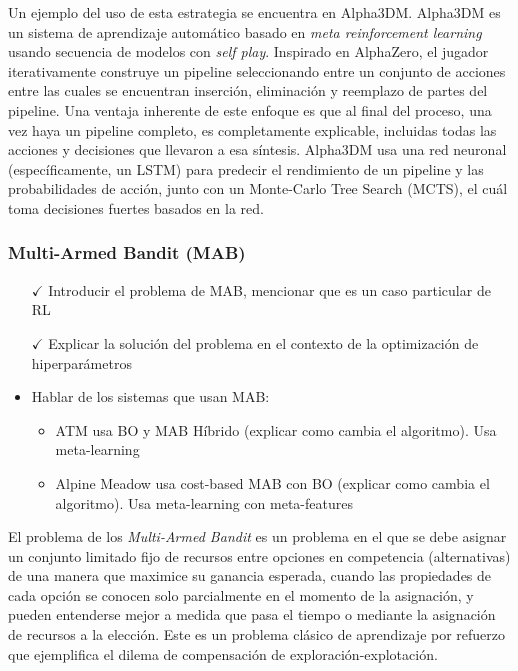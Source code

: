 Un ejemplo del uso de esta estrategia se encuentra en Alpha3DM. Alpha3DM es un sistema de aprendizaje automático basado en \textit{meta reinforcement learning} usando secuencia de modelos con \textit{self play}. Inspirado en AlphaZero, el jugador iterativamente construye un pipeline seleccionando entre un conjunto de acciones entre las cuales se encuentran inserción, eliminación y reemplazo de partes del pipeline. Una ventaja inherente de este enfoque es que al final del proceso, una vez haya un pipeline completo, es completamente explicable, incluidas todas las acciones y decisiones que llevaron a esa síntesis. Alpha3DM usa una red neuronal (específicamente, un LSTM)  para predecir el rendimiento de un pipeline y las probabilidades de acción, junto con un Monte-Carlo Tree Search (MCTS), el cuál toma decisiones fuertes basados en la red.

\subsubsection{Multi-Armed Bandit (MAB)}


\begin{itemize}
	\item[$\checkmark$] Introducir el problema de MAB, mencionar que es un caso particular de RL
	\item[$\checkmark$] Explicar la solución del problema en el contexto de la optimización de hiperparámetros
	\item Hablar de los sistemas que usan MAB:
	\begin{itemize}
		\item ATM usa BO y MAB Híbrido (explicar como cambia el algoritmo). Usa meta-learning
		\item Alpine Meadow usa cost-based MAB con BO (explicar como cambia el algoritmo). Usa meta-learning con meta-features
	\end{itemize}
\end{itemize}

El problema de los \textit{Multi-Armed Bandit} es un problema en el que se debe asignar un conjunto limitado fijo de recursos entre opciones en competencia (alternativas) de una manera que maximice su ganancia esperada, cuando las propiedades de cada opción se conocen solo parcialmente en el momento de la asignación, y pueden entenderse mejor a medida que pasa el tiempo o mediante la asignación de recursos a la elección. Este es un problema clásico de aprendizaje por refuerzo que ejemplifica el dilema de compensación de exploración-explotación.

